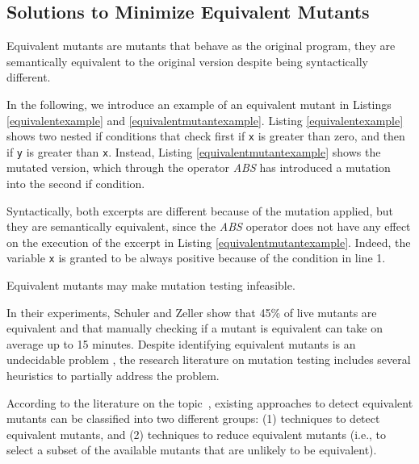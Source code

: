 
\subsection{Solutions to Minimize Equivalent Mutants}
\label{sec:opt:equivalent}

Equivalent mutants are mutants that behave as the original program, they are semantically equivalent to the original version despite being syntactically different. 

In the following, we introduce an example of an equivalent mutant in Listings \ref{equivalentexample} and \ref{equivalentmutantexample}. Listing \ref{equivalentexample} shows two nested if conditions that check first if \texttt{x} is greater than zero, and then if \texttt{y} is greater than \texttt{x}. Instead, Listing \ref{equivalentmutantexample} shows the mutated version, which through the operator \textit{ABS} has introduced a mutation into the second if condition.



Syntactically, both excerpts are different because of the mutation applied, but they are semantically equivalent, since the \textit{ABS} operator does not have any effect on the execution of the excerpt in Listing \ref{equivalentmutantexample}. Indeed, the variable \texttt{x} is granted to be always positive because of the condition in line 1.

Equivalent mutants may make mutation testing infeasible.  

In their experiments, Schuler and Zeller \cite{schuler2013covering} show that 45\% of live mutants are equivalent and that manually checking if a mutant is equivalent can take on average up to 15 minutes. Despite identifying equivalent mutants is an undecidable problem \cite{madeyski2013overcoming}, the research literature on mutation testing includes several heuristics to partially address the problem. 

According to the literature on the topic~\cite{madeyski2013overcoming}, existing approaches to detect equivalent mutants can be classified into two different groups: (1) techniques to detect equivalent mutants, and (2) techniques to reduce equivalent mutants (i.e., to select a subset of the available mutants that are unlikely to be equivalent).

